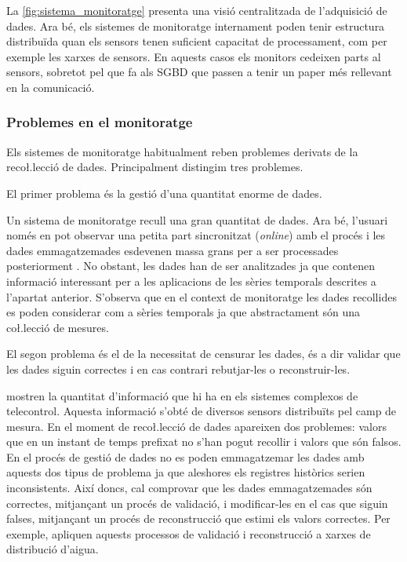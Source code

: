 La \autoref{fig:sistema_monitoratge} presenta una visió centralitzada de l'adquisició de dades. Ara bé, els sistemes de monitoratge internament poden tenir estructura distribuïda quan els sensors tenen suficient capacitat de processament, com per exemple les xarxes de sensors. En aquests casos els monitors cedeixen parts al sensors, sobretot pel que fa als SGBD que passen a tenir un paper més rellevant en la comunicació.  







\subsubsection{Problemes en el monitoratge}

Els sistemes de monitoratge habitualment reben problemes derivats de la reco\l.lecció de dades. Principalment distingim tres problemes.

El primer problema és la gestió d'una quantitat enorme de dades. 

Un sistema de monitoratge recull una gran quantitat de dades. Ara bé, l'usuari només en pot observar una petita part sincronitzat (\emph{online}) amb el procés i les dades emmagatzemades esdevenen massa grans per a ser processades posteriorment \parencite{keogh97}. No obstant, les dades han de ser analitzades ja que contenen informació interessant per a les aplicacions de les sèries temporals descrites a l'apartat anterior. S'observa que en el context de monitoratge les dades recollides es poden considerar com a sèries temporals ja que abstractament són una co\l.lecció de mesures.


El segon problema és el de la necessitat de censurar les dades, és a dir validar que les dades siguin correctes i en cas contrari rebutjar-les o reconstruir-les. 

\textcite{quevedo10} mostren la quantitat d'informació que hi ha en els sistemes complexos de telecontrol. Aquesta informació s'obté de diversos sensors distribuïts pel camp de mesura.
En el moment de reco\l.lecció de dades apareixen dos problemes: valors que en un instant de temps prefixat no s'han pogut recollir i valors que són falsos. En el procés de gestió de dades no es poden emmagatzemar les dades amb aquests dos tipus de problema ja que aleshores els registres històrics serien inconsistents. 
Així doncs, cal comprovar que les dades emmagatzemades són correctes, mitjançant un procés de validació, i modificar-les en el cas que siguin falses, mitjançant un procés de reconstrucció que estimi els valors correctes. Per exemple, \citeauthor{quevedo10} apliquen aquests processos de validació i reconstrucció a xarxes de distribució d'aigua.


